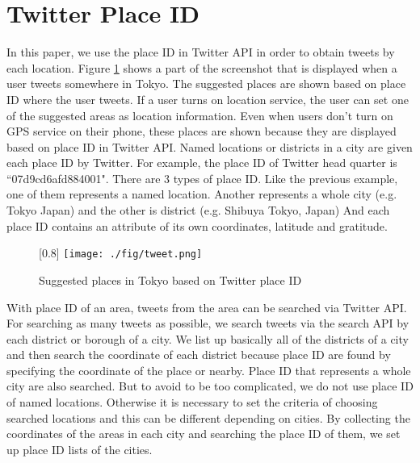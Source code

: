 \documentclass[twocolumn]{article}
\begin{document}
\vspace{-6mm}

\section{Twitter Place ID}\label{sec:placeid}
\vspace{-2mm}
In this paper, we use the place ID in Twitter API \cite{twitter_api_placeid} in order to obtain tweets by each location. 
Figure \ref{fig:tweet} shows a part of the screenshot that is displayed when a user tweets somewhere in Tokyo.
The suggested places are shown based on place ID where the user tweets.
If a user turns on location service, the user can set one of the suggested areas as location information. 
Even when users don't turn on GPS service on their phone, these places are shown because they are displayed based on place ID in Twitter API.
Named locations or districts in a city are given each place ID by Twitter.
For example, the place ID of Twitter head quarter is ``07d9cd6afd884001".
There are 3 types of place ID.
Like the previous example, one of them represents a named location.
Another represents a whole city (e.g. Tokyo Japan) and the other is district (e.g. Shibuya Tokyo, Japan)
And each place ID contains an attribute of its own coordinates, latitude and gratitude.

\begin{figure}
	\centering
	\scalebox{0.7}[0.8]{
	\texttt{[image: ./fig/tweet.png]}
	}
	\caption{Suggested places in Tokyo based on Twitter place ID}
	\label{fig:tweet}
\end{figure}

With place ID of an area, tweets from the area can be searched via Twitter API.
For searching as many tweets as possible, we search tweets via the search API by each district or borough of a city.
We list up basically all of the districts of a city and then search the coordinate of each district because place ID are found by specifying the coordinate of the place or nearby.
Place ID that represents a whole city are also searched.
But to avoid to be too complicated, we do not use place ID of named locations.
Otherwise it is necessary to set the criteria of choosing searched locations and this can be different depending on cities.
By collecting the coordinates of the areas in each city and searching the place ID of them, we set up place ID lists of the cities.
\end{document}
